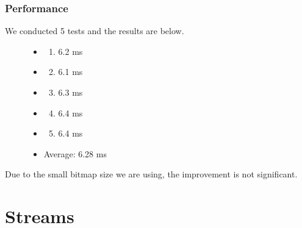 \documentclass[letterpaper,10pt,openany,oneside]{sphinxmanual}
\begin{document}
\subsection{Performance}
\label{RTACM/RTACM:id2}\begin{description}
\item[{We conducted 5 tests and the results are below.}] \leavevmode\begin{itemize}
\item {} \begin{enumerate}
\item {} 
6.2 ms

\end{enumerate}

\item {} \begin{enumerate}
\setcounter{enumi}{1}
\item {} 
6.1 ms

\end{enumerate}

\item {} \begin{enumerate}
\setcounter{enumi}{2}
\item {} 
6.3 ms

\end{enumerate}

\item {} \begin{enumerate}
\setcounter{enumi}{3}
\item {} 
6.4 ms

\end{enumerate}

\item {} \begin{enumerate}
\setcounter{enumi}{4}
\item {} 
6.4 ms

\end{enumerate}

\item {} 
Average: 6.28 ms

\end{itemize}

\end{description}

Due to the small bitmap size we are using, the improvement is not significant.


\chapter{Streams}
\label{Streams/Streams:streams}\label{Streams/Streams::doc}
\end{document}
